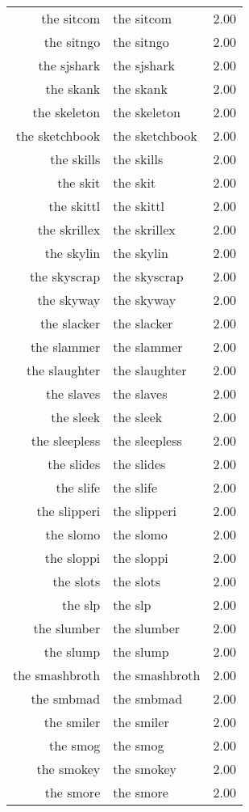 \begin{table}[ht]
\begin{tabular}{rlr}
  the sitcom & the sitcom & 2.00 \\ 
  the sitngo & the sitngo & 2.00 \\ 
  the sjshark & the sjshark & 2.00 \\ 
  the skank & the skank & 2.00 \\ 
  the skeleton & the skeleton & 2.00 \\ 
  the sketchbook & the sketchbook & 2.00 \\ 
  the skills & the skills & 2.00 \\ 
  the skit & the skit & 2.00 \\ 
  the skittl & the skittl & 2.00 \\ 
  the skrillex & the skrillex & 2.00 \\ 
  the skylin & the skylin & 2.00 \\ 
  the skyscrap & the skyscrap & 2.00 \\ 
  the skyway & the skyway & 2.00 \\ 
  the slacker & the slacker & 2.00 \\ 
  the slammer & the slammer & 2.00 \\ 
  the slaughter & the slaughter & 2.00 \\ 
  the slaves & the slaves & 2.00 \\ 
  the sleek & the sleek & 2.00 \\ 
  the sleepless & the sleepless & 2.00 \\ 
  the slides & the slides & 2.00 \\ 
  the slife & the slife & 2.00 \\ 
  the slipperi & the slipperi & 2.00 \\ 
  the slomo & the slomo & 2.00 \\ 
  the sloppi & the sloppi & 2.00 \\ 
  the slots & the slots & 2.00 \\ 
  the slp & the slp & 2.00 \\ 
  the slumber & the slumber & 2.00 \\ 
  the slump & the slump & 2.00 \\ 
  the smashbroth & the smashbroth & 2.00 \\ 
  the smbmad & the smbmad & 2.00 \\ 
  the smiler & the smiler & 2.00 \\ 
  the smog & the smog & 2.00 \\ 
  the smokey & the smokey & 2.00 \\ 
  the smore & the smore & 2.00 \\ 

\end{tabular}
\end{table}
